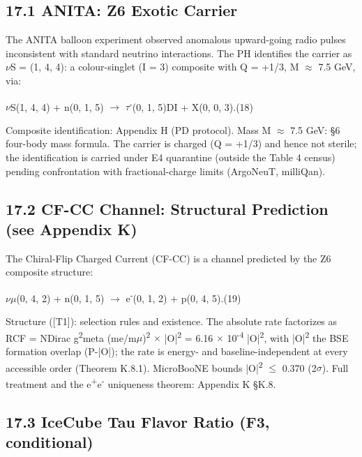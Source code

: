 \documentclass[11pt,letterpaper]{article}
\begin{document}
\subsection*{17.1  ANITA: Z6 Exotic Carrier}

\noindent The ANITA balloon experiment observed anomalous upward-going radio pulses inconsistent with standard neutrino interactions. The PH identifies the carrier as $\nu$S = (1, 4, 4): a colour-singlet (I = 3) composite with Q = +1/3, M $\approx$ 7.5 GeV, via:

\begingroup\centering $\nu$S(1, 4, 4) + n(0, 1, 5) $\to$ $\tau$\textsuperscript{-}(0, 1, 5)DI + X(0, 0, 3).\hspace{2em}(18)\par\endgroup

\noindent Composite identification: Appendix H (PD protocol). Mass M $\approx$ 7.5 GeV: §6 four-body mass formula. The carrier is charged (Q = +1/3) and hence not sterile; the identification is carried under E4 quarantine (outside the Table 4 census) pending confrontation with fractional-charge limits (ArgoNeuT, milliQan).

\subsection*{17.2  CF-CC Channel: Structural Prediction (see Appendix K)}

\noindent The Chiral-Flip Charged Current (CF-CC) is a channel predicted by the Z6 composite structure:

\begingroup\centering $\nu$$\mu$(0, 4, 2) + n(0, 1, 5) $\to$ e\textsuperscript{-}(0, 1, 2) + p(0, 4, 5).\hspace{2em}(19)\par\endgroup

\noindent Structure ([T1]): selection rules and existence. The absolute rate factorizes as RCF = NDirac g\textsuperscript{2}meta (me/m$\mu$)\textsuperscript{2} $\times$ |O|\textsuperscript{2} = 6.16 $\times$ 10\textsuperscript{-4} |O|\textsuperscript{2}, with |O|\textsuperscript{2} the BSE formation overlap (P-|O|); the rate is energy- and baseline-independent at every accessible order (Theorem K.8.1). MicroBooNE bounds |O|\textsuperscript{2} $\le$ 0.370 (2$\sigma$). Full treatment and the e\textsuperscript{+}e\textsuperscript{-} uniqueness theorem: Appendix K §K.8.

\subsection*{17.3  IceCube Tau Flavor Ratio (F3, conditional)}
\end{document}
